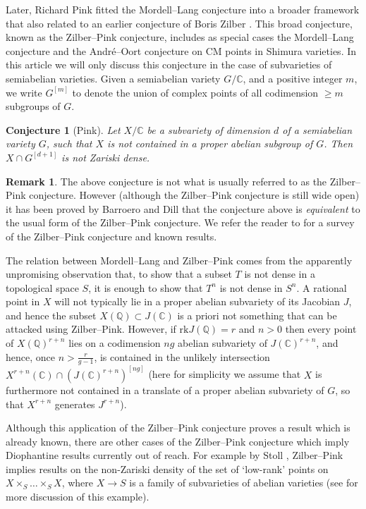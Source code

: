 \documentclass{amsart}
\def\Q{\mathbb Q}
\def\C{\mathbb C}
\newcommand{\rk}{\mathrm{rk}}
\newtheorem{conjecture}{Conjecture}
\theoremstyle{definition}
\newtheorem{remark}{Remark}
\begin{document}
Later, Richard Pink fitted the Mordell--Lang conjecture into a broader framework that also related to an earlier conjecture of Boris Zilber \cite{pink} \cite{zilber}. This broad conjecture, known as the Zilber--Pink conjecture, includes as special cases the Mordell--Lang conjecture and the Andr\'e--Oort conjecture on CM points in Shimura varieties. In this article we will only discuss this conjecture in the case of subvarieties of semiabelian varieties. Given a semiabelian variety $G/\mathbb{C}$, and a positive integer $m$, we write $G^{[m]}$ to denote the union of complex points of all codimension $\geq m$ subgroups of $G$.
\begin{conjecture}[Pink]\label{conj:pink}
Let $X/\mathbb{C}$ be a subvariety of dimension $d$ of a semiabelian variety $G$, such that $X$ is not contained in a proper abelian subgroup of $G$. Then $X\cap G^{[d+1]}$ is not Zariski dense.
\end{conjecture}
\begin{remark}
The above conjecture is not what is usually referred to as the Zilber--Pink conjecture. However (although the Zilber--Pink conjecture is still wide open) it has been proved by Barroero and Dill \cite{BD25} that the conjecture above is \textit{equivalent} to the usual form of the Zilber--Pink conjecture. We refer the reader to \cite{pila} for a survey of the Zilber--Pink conjecture and known results.
\end{remark}
The relation between Mordell--Lang and Zilber--Pink comes from the apparently unpromising observation that, to show that a subset $T$ is not dense in a topological space $S$, it is enough to show that $T^n$ is not dense in $S^n$. A rational point in $X$ will not typically lie in a proper abelian subvariety of its Jacobian $J$, and hence the subset $X(\Q )\subset J(\mathbb{C})$ is a priori not something that can be attacked using Zilber--Pink. However, if $\rk J(\Q )=r$ and $n>0$ then every point of $X(\Q )^{r+n}$ lies on a codimension $ng$ abelian subvariety of $J(\C )^{r+n}$, and hence, once $n>\frac{r}{g-1}$, is contained in the unlikely intersection $X^{r+n}(\mathbb{C})\cap (J(\mathbb{C})^{r+n} )^{[ng]}$ (here for simplicity we assume that $X$ is furthermore not contained in a translate of a proper abelian subvariety of $G$, so that $X^{r+n}$ generates $J^{r+n}$).

Although this application of the Zilber--Pink conjecture proves a result which is already known, there are other cases of the Zilber--Pink conjecture which imply Diophantine results currently out of reach. For example by Stoll \cite{stoll:uniform}, Zilber--Pink implies results on the non-Zariski density of the set of `low-rank' points on $X\times _S \ldots \times _S X$, where $X\to S$ is a family of subvarieties of abelian varieties (see \cite{D22} for more discussion of this example).
\end{document}
